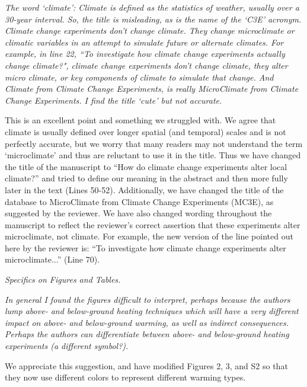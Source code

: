 \documentclass[11pt,a4paper]{letter}
\begin{document}
\begin{letter}{}
\par \emph{The word `climate': Climate is defined as the statistics of weather, usually over a 30-year interval. So, the title is misleading, as is the name of the `C3E' acronym.  Climate change experiments don't change climate.  They change microclimate or climatic variables in an attempt to simulate future or alternate climates.  For example, in line 22, ``To investigate how climate change experiments actually change climate?", climate change experiments don't change climate, they alter micro climate, or key components of climate to simulate that change.  And Climate from Climate Change Experiments, is really MicroClimate from Climate Change Experiments. I find the title `cute' but not accurate.}

\par This is an excellent point and something we struggled with. We agree that climate is usually defined over longer spatial (and temporal) scales and is not perfectly accurate, but we worry that many readers may not understand the term `microclimate' and thus are reluctant to use it in the title. Thus we have changed the title of the manuscript to ``How do climate change experiments alter local climate?'' and tried to define our meaning in the abstract and then more fully later in the text (Lines 50-52). Additionally, we have changed the title of the database to MicroClimate from Climate Change Experiments (MC3E), as suggested by the reviewer. We have also changed wording throughout the manuscript to reflect the reviewer's correct assertion that these experiments alter microclimate, not climate. For example, the new version of the line pointed out here by the reviewer is: ``To investigate how climate change experiments alter microclimate...'' (Line 70).

\par \emph{Specifics on Figures and Tables.}
\par \emph{In general I found the figures difficult to interpret, perhaps because the authors lump above- and below-ground heating techniques which will have a very different impact on above- and below-ground warming, as well as indirect consequences.  Perhaps the authors can differentiate between above- and below-ground heating experiments (a different symbol?).}
\par We appreciate this suggestion, and have modified Figures 2, 3, and S2 so that they now use different colors  to represent different warming types.


\end{letter}
\end{document}
